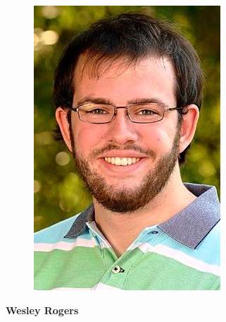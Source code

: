 \documentclass[a4paper,12pt,final]{memoir}
\newcommand{\Sep}{\vspace{1.5em}}
\newenvironment{AboutMe}
	{\ignorespaces\textbf{\color{RoyalBlue} About me}}
	{\Sep\ignorespacesafterend}
\begin{document}
\begin{figure}
	\hfill
	\includegraphics[width=0.75\columnwidth]{photo.png}
    \vspace{-9cm}
\end{figure}

\begin{flushright}\small
\end{flushright}\normalsize

\framebreak


\Huge\bfseries {\color{RoyalBlue} Wesley Rogers} \\
\normalsize\normalfont
\end{document}

